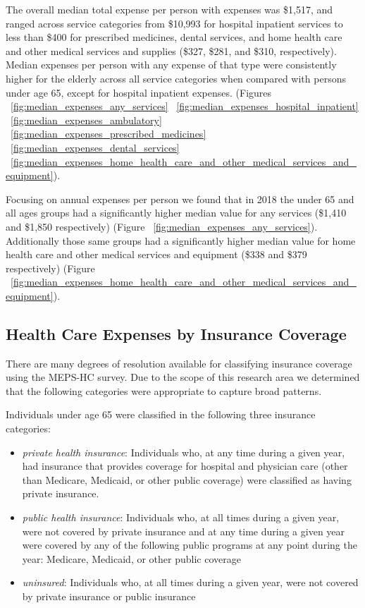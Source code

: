 \documentclass{ucetd}
\begin{document}
The overall median total expense per person with expenses was \$1,517, and ranged across service categories from \$10,993 for hospital inpatient services to less than \$400 for prescribed medicines, dental services, and home health care and other medical services and supplies (\$327, \$281, and \$310, respectively). Median expenses per person with any expense of that type were consistently higher for the elderly across all service categories when compared with persons under age 65, except for hospital inpatient expenses. (Figures ~\ref{fig:median_expenses_any_services} ~\ref{fig:median_expenses_hospital_inpatient} ~\ref{fig:median_expenses_ambulatory} ~\ref{fig:median_expenses_prescribed_medicines} ~\ref{fig:median_expenses_dental_services} ~\ref{fig:median_expenses_home_health_care_and_other_medical_services_and_equipment}). 

Focusing on annual expenses per person we found that in 2018 the under 65 and all ages groups had a significantly higher median value for any services (\$1,410 and \$1,850 respectively) (Figure ~\ref{fig:median_expenses_any_services}). Additionally those same groups had a significantly higher median value for home health care and other medical services and equipment (\$338 and \$379 respectively) (Figure ~\ref{fig:median_expenses_home_health_care_and_other_medical_services_and_equipment}).

\subsection{ Health Care Expenses by Insurance Coverage}
There are many degrees of resolution available for classifying insurance coverage using the MEPS-HC survey. Due to the scope of this research area we determined that the following categories were appropriate to capture broad patterns.

Individuals under age 65 were classified in the following three insurance categories:

\begin{itemize}
  \item \textit{private health insurance}: Individuals who, at any time during a given year, had insurance that provides coverage for hospital and physician care (other than Medicare, Medicaid, or other public coverage) were classified as having private insurance.
  \item \textit{public health insurance}: Individuals who, at all times during a given year, were not covered by private insurance and at any time during a given year were covered by any of the following public programs at any point during the year: Medicare, Medicaid, or other public coverage
  \item \textit{uninsured}: Individuals who, at all times during a given year, were not covered by private insurance or public insurance
\end{itemize}
\end{document}
